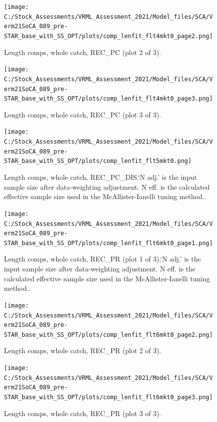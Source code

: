 \documentclass[11pt,
  english,
  a4paper,
]{article}
\begin{document}
\begin{figure}
\centering
\texttt{[image: C:/Stock\_Assessments/VRML\_Assessment\_2021/Model\_files/SCA/Verm21SoCA\_089\_pre-STAR\_base\_with\_SS\_OPT/plots/comp\_lenfit\_flt4mkt0\_page2.png]}
\caption{Length comps, whole catch, REC\_PC (plot 2 of 3).\label{fig:comp_lenfit_flt4mkt0_page2}}
\end{figure}

\begin{figure}
\centering
\texttt{[image: C:/Stock\_Assessments/VRML\_Assessment\_2021/Model\_files/SCA/Verm21SoCA\_089\_pre-STAR\_base\_with\_SS\_OPT/plots/comp\_lenfit\_flt4mkt0\_page3.png]}
\caption{Length comps, whole catch, REC\_PC (plot 3 of 3).\label{fig:comp_lenfit_flt4mkt0_page3}}
\end{figure}

\begin{figure}
\centering
\texttt{[image: C:/Stock\_Assessments/VRML\_Assessment\_2021/Model\_files/SCA/Verm21SoCA\_089\_pre-STAR\_base\_with\_SS\_OPT/plots/comp\_lenfit\_flt5mkt0.png]}
\caption{Length comps, whole catch, REC\_PC\_DIS.`N adj.' is the input sample size after data-weighting adjustment. N eff. is the calculated effective sample size used in the McAllister-Ianelli tuning method..\label{fig:comp_lenfit_flt5mkt0}}
\end{figure}

\begin{figure}
\centering
\texttt{[image: C:/Stock\_Assessments/VRML\_Assessment\_2021/Model\_files/SCA/Verm21SoCA\_089\_pre-STAR\_base\_with\_SS\_OPT/plots/comp\_lenfit\_flt6mkt0\_page1.png]}
\caption{Length comps, whole catch, REC\_PR (plot 1 of 3).`N adj.' is the input sample size after data-weighting adjustment. N eff. is the calculated effective sample size used in the McAllister-Ianelli tuning method..\label{fig:comp_lenfit_flt6mkt0_page1}}
\end{figure}

\begin{figure}
\centering
\texttt{[image: C:/Stock\_Assessments/VRML\_Assessment\_2021/Model\_files/SCA/Verm21SoCA\_089\_pre-STAR\_base\_with\_SS\_OPT/plots/comp\_lenfit\_flt6mkt0\_page2.png]}
\caption{Length comps, whole catch, REC\_PR (plot 2 of 3).\label{fig:comp_lenfit_flt6mkt0_page2}}
\end{figure}

\begin{figure}
\centering
\texttt{[image: C:/Stock\_Assessments/VRML\_Assessment\_2021/Model\_files/SCA/Verm21SoCA\_089\_pre-STAR\_base\_with\_SS\_OPT/plots/comp\_lenfit\_flt6mkt0\_page3.png]}
\caption{Length comps, whole catch, REC\_PR (plot 3 of 3).\label{fig:comp_lenfit_flt6mkt0_page3}}
\end{figure}
\end{document}
